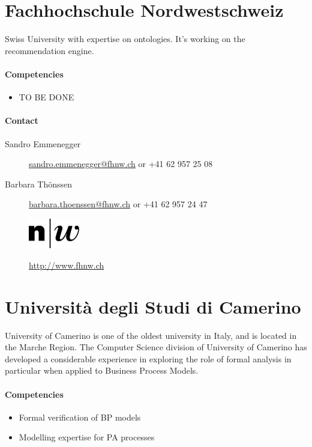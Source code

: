 \documentclass{learnpad}
\begin{document}
\section{Fachhochschule Nordwestschweiz}
Swiss University with expertise on ontologies.  It's working on the
recommendation engine.

\paragraph{Competencies}
\begin{itemize}
	\item TO BE DONE
\end{itemize}

\paragraph{Contact}
\begin{description}
	\item[Sandro Emmenegger] \href{mailto:sandro.emmenegger@fhnw.ch}{sandro.emmenegger@fhnw.ch} or +41 62 957 25 08
	\item[Barbara Thönssen] \href{mailto:barbara.thoenssen@fhnw.ch}{barbara.thoenssen@fhnw.ch} or +41 62 957 24 47
\end{description}

\begin{figure}[!htp]
	\centering
	\includegraphics[width=6em,keepaspectratio]{figures/fhnw.jpg}\par
	\url{http://www.fhnw.ch}
\end{figure}

\section{Università degli Studi di Camerino}
University of Camerino is one of the oldest university in Italy, and is located
in the Marche Region.  The Computer Science division of University of Camerino
has developed a considerable experience in exploring the role of formal analysis
in particular when applied to Business Process Models.

\paragraph{Competencies}
\begin{itemize}
	\item Formal verification of BP models
	\item Modelling expertise for PA processes
\end{itemize}
\end{document}
